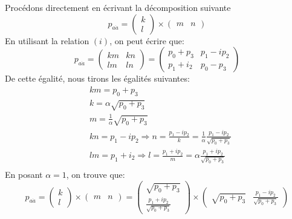 \documentclass[12pt, a4paper]{article}
\begin{document}
		Procédons directement en écrivant la décomposition suivante
	\begin{equation}
		p_{a \dot{a}}=
		\begin{pmatrix}
			k\\
			l
		\end{pmatrix}  \times 
		\begin{pmatrix}
			m & n
		\end{pmatrix}	
	\end{equation}
	En utilisant la relation \((i)\), on peut écrire que:
	\begin{equation}
			p_{a \dot{a}}=
			\begin{pmatrix}
				km & kn\\
				lm & ln
			\end{pmatrix} = 
			\begin{pmatrix}
			p_0 + p_3 & p_1-ip_2\\
			p_1 + i_2 & p_0 - p_3
			\end{pmatrix} 
	\end{equation}
	De cette égalité, nous tirons les égalités suivantes:
	\begin{equation}
		\begin{split}
			&km= p_0 + p_3\\
			&k=\alpha \sqrt{p_0 + p_3}\\
			&m=\frac{1}{\alpha} \sqrt{p_0 + p_3}\\
			&kn=p_1-ip_2 \Rightarrow n= \frac{p_1-ip_2}{k}=\frac{1}{\alpha} \frac{p_1-ip_2}{ \sqrt{p_0 + p_3}}\\
			&lm=p_1 + i_2 \Rightarrow l= \frac{p_1+ip_2}{m}= 
			\alpha \frac{p_1+ip_2}{ \sqrt{p_0 + p_3}}\\
		\end{split}
	\end{equation}
	En posant \(\alpha=1\), on trouve que:
	\begin{equation}
	p_{a \dot{a}}=
	\begin{pmatrix}
		k\\
		l
	\end{pmatrix}  \times 
	\begin{pmatrix}
		m & n
	\end{pmatrix}	=
	\begin{pmatrix}
		\sqrt{p_0 + p_3}\\
		\frac{p_1+ip_2}{ \sqrt{p_0 + p_3}}
	\end{pmatrix}  \times 
	\begin{pmatrix}
		\sqrt{p_0 + p_3} & \frac{p_1-ip_2}{ \sqrt{p_0 + p_3}}
	\end{pmatrix}
	\end{equation}
\end{document}
